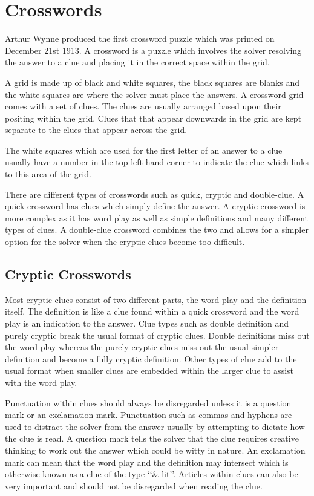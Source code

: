 \section{Crosswords}

Arthur Wynne produced the first crossword puzzle which was printed on December
21st 1913. A crossword is a puzzle which involves the solver resolving the
answer to a clue and placing it in the correct space within the grid. 

A grid is made up of black and white squares, the black squares are blanks and 
the white squares are where the solver must place the answers. A crossword grid 
comes with a set of clues. The clues are usually arranged based upon their 
positing within the grid. Clues that that appear downwards in the grid are kept 
separate to the clues that appear across the grid. 

The white squares which are used for the first letter of an answer to a clue 
usually have a number in the top left hand corner to indicate the clue which 
links to this area of the grid.

There are different types of crosswords such as quick, cryptic and double-clue.
A quick crossword has clues which simply define the answer. A cryptic crossword
is more complex as it has word play as well as simple definitions and many
different types of clues. A double-clue crossword combines the two and allows
for a simpler option for the solver when the cryptic clues become too difficult.


\newpage



\subsection{Cryptic Crosswords}
Most cryptic clues consist of two different parts, the word play and the definition itself. The definition is like a clue found within a quick crossword and the word play is an indication to the answer. Clue types such as double definition and purely cryptic break the usual format of cryptic clues. Double definitions miss out the word play whereas the purely cryptic clues miss out the usual simpler definition and become a fully cryptic definition. Other types of clue add to the usual format when smaller clues are embedded within the larger clue to assist with the word play.

Punctuation within clues should always be disregarded unless it is a question mark or an exclamation mark. Punctuation such as commas and hyphens are used to distract the solver from the answer usually by attempting to dictate how the clue is read. A question mark tells the solver that the clue requires creative thinking to work out the answer which could be witty in nature. An exclamation mark can mean that the word play and the definition may intersect which is otherwise known as a clue of the type \lq\lq \& lit\rq\rq. Articles within clues can also be very important and should not be disregarded when reading the clue.

